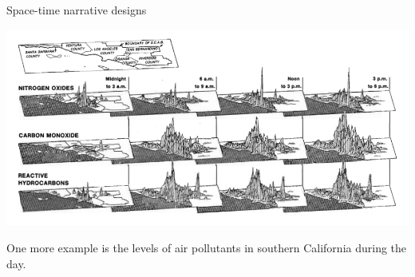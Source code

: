\documentclass[
  ignorenonframetext,
]{beamer}
\begin{document}
\begin{frame}{Space-time narrative designs}
\protect\hypertarget{space-time-narrative-designs-2}{}
\begin{minipage}{1\textwidth}
\centering
\includegraphics[width=\textwidth]{excellence_figs/fig_23.png}
\end{minipage}
\hfill
\begin{minipage}{1\textwidth}
\footnotesize
\vspace{3mm}
One more example is the levels of air pollutants in southern California during the day.
\end{minipage}
\end{frame}
\end{document}
